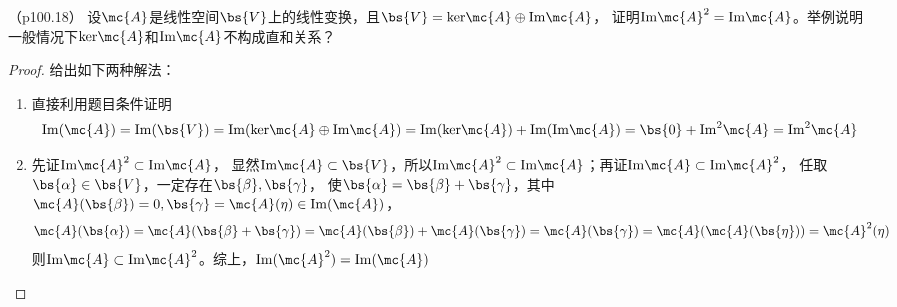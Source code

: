 \documentclass[12pt, a4paper, oneside, UTF8]{ctexbook}
\begin{document}
\begin{question}（p100.18）
    设$\mc{A}$是线性空间$\bs{V}$上的线性变换，且$\bs{V}=\mathrm{ker}\mc{A} \oplus  \mathrm{Im} \mc{A}$，
    证明$\mathrm{Im}\mc{A}^2=\mathrm{Im}\mc{A}$。举例说明一般情况下$\mathrm{ker}\mc{A}$和$\mathrm{Im}\mc{A}$不构成直和关系？
    
\end{question}

\begin{proof}
    给出如下两种解法：
    \begin{enumerate}[label=(\arabic*)]
        \item 直接利用题目条件证明
    \begin{align*}
        \mathrm{Im}(\mc{A})=\mathrm{Im}(\bs{V})=\mathrm{Im}(\mathrm{ker}\mc{A} \oplus  \mathrm{Im} \mc{A})=\mathrm{Im}(\mathrm{ker}\mc{A})+\mathrm{Im}(\mathrm{Im}\mc{A})
        =\bs{0}+\mathrm{Im}^2\mc{A}=\mathrm{Im}^2\mc{A}
    \end{align*}
    \item 先证$\mathrm{Im}\mc{A}^2 \subset \mathrm{Im}\mc{A}$，
    显然$\mathrm{Im}\mc{A} \subset \bs{V}$，所以$\mathrm{Im}\mc{A}^2 \subset \mathrm{Im}\mc{A}$；再证$\mathrm{Im}\mc{A} \subset \mathrm{Im}\mc{A}^2$，
    任取$\bs{\alpha} \in \bs{V}$，一定存在$\bs{\beta},\bs{\gamma}$，
    使$\bs{\alpha}=\bs{\beta}+\bs{\gamma}$，其中$\mc{A}(\bs{\beta})=0,\bs{\gamma}=\mc{A}(\eta) \in \mathrm{Im}(\mc{A})$，
    \begin{align*}
        \mc{A}(\bs{\alpha})=\mc{A}(\bs{\beta}+\bs{\gamma})=
        \mc{A}(\bs{\beta})+\mc{A}(\bs{\gamma})=\mc{A}(\bs{\gamma})=\mc{A}(\mc{A}(\bs{\eta}))
        =\mc{A}^2(\eta)
    \end{align*}
    则$\mathrm{Im}\mc{A} \subset \mathrm{Im}\mc{A}^2$。综上，$\mathrm{Im}(\mc{A}^2)=\mathrm{Im}(\mc{A})$
    
\end{enumerate}
\end{proof}
\end{document}
